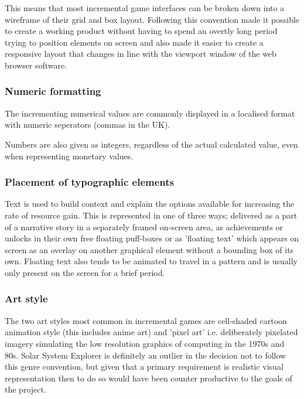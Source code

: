 \documentclass[twoside]{bhamthesis}
\begin{document}
This means that most incremental game interfaces can be broken down into a wireframe of their grid and box layout. Following this convention made it possible to create a working product without having to spend an overtly long period trying to position elements on screen and also made it easier to create a responsive layout that changes in line with the viewport window of the web browser software.

\subsubsection{Numeric formatting}

The incrementing numerical values are commonly displayed in a localised format with numeric seperators (commas in the UK).

Numbers are also given as integers, regardless of the actual calculated value, even when representing monetary values.



\subsubsection{Placement of typographic elements}

Text is used to build context and explain the options available for increasing the rate of resource gain. This is represented in one of three ways; delivered as a part of a narrative story in a separately framed on-screen area, as achievements or unlocks in their own free floating puff-boxes or as 'floating text' which appears on screen as an overlay on another graphical element without a bounding box of its own. Floating text also tends to be animated to travel in a pattern and is usually only present on the screen for a brief period.

\subsubsection{Art style}

The two art styles most common in incremental games are cell-shaded cartoon animation style (this includes anime art) and 'pixel art' i.e. deliberately pixelated imagery simulating the low resolution graphics of computing in the 1970s and 80s. Solar System Explorer is definitely an outlier in the decision not to follow this genre convention, but given that a primary requirement is realistic visual representation then to do so would have been counter productive to the goals of the project.
\end{document}
